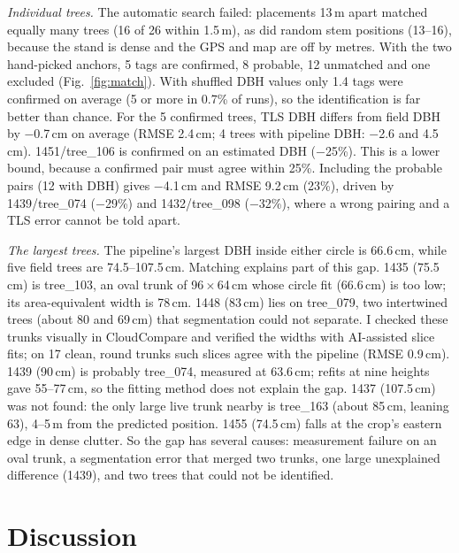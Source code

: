 \documentclass[runningheads]{llncs}
\begin{document}
\emph{Individual trees.} The automatic search failed: placements 13\,m apart matched equally many trees (16 of 26 within 1.5\,m), as did random stem positions (13--16), because the stand is dense and the GPS and map are off by metres. With the two hand-picked anchors, 5 tags are confirmed, 8 probable, 12 unmatched and one excluded (Fig.~\ref{fig:match}). With shuffled DBH values only 1.4 tags were confirmed on average (5 or more in 0.7\% of runs), so the identification is far better than chance. For the 5 confirmed trees, TLS DBH differs from field DBH by $-$0.7\,cm on average (RMSE 2.4\,cm; 4 trees with pipeline DBH: $-$2.6 and 4.5\,cm). 1451/tree\_106 is confirmed on an estimated DBH ($-$25\%). This is a lower bound, because a confirmed pair must agree within 25\%. Including the probable pairs (12 with DBH) gives $-$4.1\,cm and RMSE 9.2\,cm (23\%), driven by 1439/tree\_074 ($-$29\%) and 1432/tree\_098 ($-$32\%), where a wrong pairing and a TLS error cannot be told apart.

\emph{The largest trees.} The pipeline's largest DBH inside either circle is 66.6\,cm, while five field trees are 74.5--107.5\,cm. Matching explains part of this gap. 1435 (75.5\,cm) is tree\_103, an oval trunk of 96\,$\times$\,64\,cm whose circle fit (66.6\,cm) is too low; its area-equivalent width is 78\,cm. 1448 (83\,cm) lies on tree\_079, two intertwined trees (about 80 and 69\,cm) that segmentation could not separate. I checked these trunks visually in CloudCompare and verified the widths with AI-assisted slice fits; on 17 clean, round trunks such slices agree with the pipeline (RMSE 0.9\,cm). 1439 (90\,cm) is probably tree\_074, measured at 63.6\,cm; refits at nine heights gave 55--77\,cm, so the fitting method does not explain the gap. 1437 (107.5\,cm) was not found: the only large live trunk nearby is tree\_163 (about 85\,cm, leaning 63\textdegree), 4--5\,m from the predicted position. 1455 (74.5\,cm) falls at the crop's eastern edge in dense clutter. So the gap has several causes: measurement failure on an oval trunk, a segmentation error that merged two trunks, one large unexplained difference (1439), and two trees that could not be identified.
\section{Discussion}\label{sec:discussion}
\end{document}

